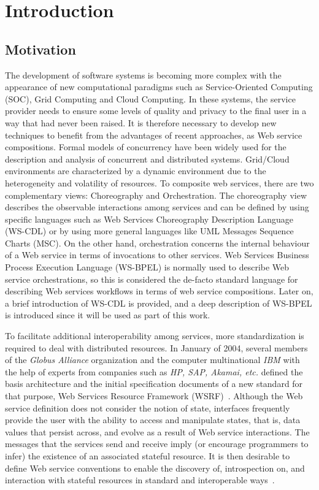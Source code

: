 \chapter{Introduction}\label{chapter:c1}

\section{Motivation}\label{scope}

The development of software systems is becoming more complex with the 
appearance
of new computational paradigms such as Service-Oriented  Computing  (SOC), 
Grid Computing and Cloud Computing.
In these systems, the service provider needs to ensure some levels of 
quality and privacy to the final
user in a way that had never been raised. It is therefore necessary 
to develop new techniques to benefit from the advantages 
of recent approaches, as Web service compositions. 
Formal models of concurrency have been widely used for the description and analysis of concurrent and distributed systems. 
Grid/Cloud environments are characterized by a dynamic environment 
due to the heterogeneity and volatility of resources. 
To composite web services, there are two complementary views: Choreography and Orchestration. 
The choreography view describes the observable interactions among services and can
be  defined  by  using  specific  languages such as Web  Services
Choreography  Description  Language  (WS-CDL) %
or  by
using more general languages like UML Messages Sequence
Charts (MSC). On the other hand, orchestration concerns
the internal behaviour of a Web service in terms of invocations
to  other  services.  Web Services Business 
Process Execution Language (WS-BPEL) \cite{Andrews2003WSBPEL} is normally used 
to describe Web service orchestrations, so this
is considered the de-facto standard language for describing Web services
workflows in terms of web service compositions. Later on, a brief introduction of WS-CDL is provided, and
a deep description of WS-BPEL is introduced since it will be used as part of this work.

To facilitate additional interoperability among services, more standardization is required to deal with distributed resources. In January of 2004, several members of the \emph{Globus Alliance} organization and the computer multinational \emph{IBM} with the help of experts from companies such as \emph{HP, SAP, Akamai, etc.} defined the basis architecture and the initial specification documents of a new standard for that purpose, Web Services Resource Framework (WSRF)~\cite{Foster2004}. Although the Web service 
definition does not consider the notion of state, interfaces frequently provide the user with the ability to access and manipulate
states, that is, data values that persist across, and evolve as a result of Web service interactions. The messages that the services 
send and receive imply (or encourage programmers to infer) the existence of an associated stateful resource. It is then desirable 
to define Web service conventions to enable the discovery of, introspection on, and interaction with stateful resources in standard 
and interoperable ways~\cite{Czajkowski2004}. 

